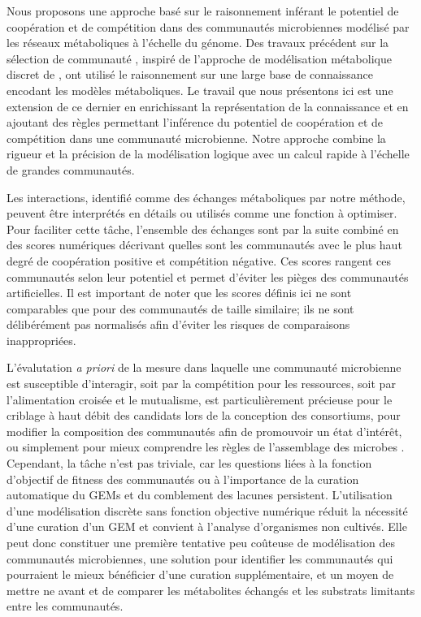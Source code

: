 Nous proposons une approche basé sur le raisonnement inférant le potentiel de coopération et de compétition dans des communautés microbiennes modélisé par les réseaux métaboliques à l'échelle du génome. Des travaux précédent sur la sélection de communauté \citep{Belcour.2020,Frioux2018}, inspiré de l'approche de modélisation métabolique discret de \citep{Ebenhoh2004}, ont utilisé le raisonnement sur une large base de connaissance encodant les modèles métaboliques. Le travail que nous présentons ici est une extension de ce dernier en enrichissant la représentation de la connaissance et en ajoutant des règles permettant l'inférence du potentiel de coopération et de compétition dans une communauté microbienne. Notre approche combine la rigueur et la précision de la modélisation logique avec un calcul rapide à l'échelle de grandes communautés.

Les interactions, identifié comme des échanges métaboliques par notre méthode, peuvent être interprétés en détails ou utilisés comme une fonction à optimiser. Pour faciliter cette tâche, l'ensemble des échanges sont par la suite combiné en des scores numériques décrivant quelles sont les communautés avec le plus haut degré de coopération positive et compétition négative. Ces scores rangent ces communautés selon leur potentiel et permet d'éviter les pièges des communautés artificielles. Il est important de noter que les scores définis ici ne sont comparables que pour des communautés de taille similaire; ils ne sont délibérément pas normalisés afin d'éviter les risques de comparaisons inappropriées.

L'évalutation \emph{a priori} de la mesure dans laquelle une communauté microbienne est susceptible d'interagir, soit par la compétition pour les ressources, soit par l'alimentation croisée et le mutualisme, est particulièrement précieuse pour le criblage à haut débit des candidats lors de la conception des consortiums, pour modifier la composition des communautés afin de promouvoir un état d'intérêt, ou simplement pour mieux comprendre les règles de l'assemblage des microbes \citep{Oliveira.2023}. Cependant, la tâche n'est pas triviale, car les questions liées à la fonction d'objectif de fitness des communautés \citep{Diener.2023} ou à l'importance de la curation automatique du GEMs et du comblement des lacunes \citep{Bernstein.2019} persistent. L'utilisation d'une modélisation discrète sans fonction objective numérique réduit la nécessité d'une curation d'un GEM et convient à l'analyse d'organismes non cultivés. Elle peut donc constituer une première tentative peu coûteuse de modélisation des communautés microbiennes, une solution pour identifier les communautés qui pourraient le mieux bénéficier d'une curation supplémentaire, et un moyen de mettre ne avant et de comparer les métabolites échangés et les substrats limitants entre les communautés. 

